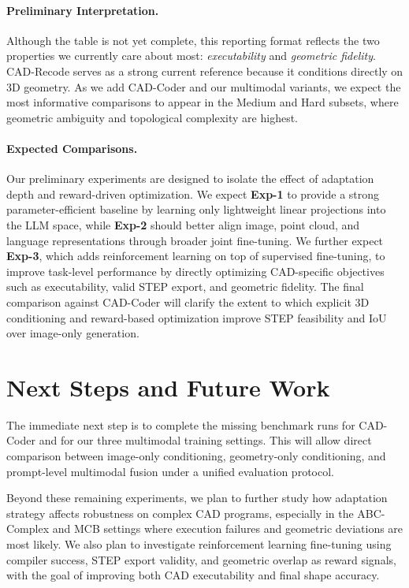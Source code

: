 \documentclass{article}
\begin{document}
\paragraph{Preliminary Interpretation.}
Although the table is not yet complete, this reporting format reflects the two properties we currently care about most: \emph{executability} and \emph{geometric fidelity}. CAD-Recode serves as a strong current reference because it conditions directly on 3D geometry. As we add CAD-Coder and our multimodal variants, we expect the most informative comparisons to appear in the Medium and Hard subsets, where geometric ambiguity and topological complexity are highest.

\paragraph{Expected Comparisons.}
Our preliminary experiments are designed to isolate the effect of adaptation depth and reward-driven optimization. We expect \textbf{Exp-1} to provide a strong parameter-efficient baseline by learning only lightweight linear projections into the LLM space, while \textbf{Exp-2} should better align image, point cloud, and language representations through broader joint fine-tuning. We further expect \textbf{Exp-3}, which adds reinforcement learning on top of supervised fine-tuning, to improve task-level performance by directly optimizing CAD-specific objectives such as executability, valid STEP export, and geometric fidelity. The final comparison against CAD-Coder will clarify the extent to which explicit 3D conditioning and reward-based optimization improve STEP feasibility and IoU over image-only generation.

\section{Next Steps and Future Work}
The immediate next step is to complete the missing benchmark runs for CAD-Coder and for our three multimodal training settings. This will allow direct comparison between image-only conditioning, geometry-only conditioning, and prompt-level multimodal fusion under a unified evaluation protocol.

Beyond these remaining experiments, we plan to further study how adaptation strategy affects robustness on complex CAD programs, especially in the ABC-Complex and MCB settings where execution failures and geometric deviations are most likely. We also plan to investigate reinforcement learning fine-tuning using compiler success, STEP export validity, and geometric overlap as reward signals, with the goal of improving both CAD executability and final shape accuracy.



\end{document}
